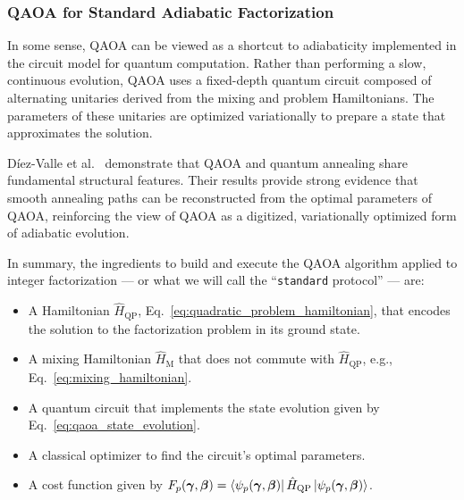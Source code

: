 \subsubsection{QAOA for Standard Adiabatic Factorization}
In some sense, QAOA can be viewed as a shortcut to adiabaticity implemented in the circuit model for quantum computation. Rather than performing a slow, continuous evolution, QAOA uses a fixed-depth quantum circuit composed of alternating unitaries derived from the mixing and problem Hamiltonians. The parameters of these unitaries are optimized variationally to prepare a state that approximates the solution.

Díez-Valle et al.~\cite{diez-valle_universal_2025} demonstrate that QAOA and quantum annealing share fundamental structural features. Their results provide strong evidence that smooth annealing paths can be reconstructed from the optimal parameters of QAOA, reinforcing the view of QAOA as a digitized, variationally optimized form of adiabatic evolution.

In summary, the ingredients to build and execute the QAOA algorithm applied to integer factorization --- or what we will call the ``\texttt{standard} protocol'' --- are:
\begin{itemize}
    \item A Hamiltonian $\hat{H}_\mathrm{QP}$, Eq.~\eqref{eq:quadratic_problem_hamiltonian}, that encodes the solution to the factorization problem in its ground state.
    \item A mixing Hamiltonian $\hat{H}_\mathrm{M}$ that does not commute with $\hat{H}_\mathrm{QP}$, e.g., Eq.~\eqref{eq:mixing_hamiltonian}.
    \item A quantum circuit that implements the state evolution given by Eq.~\eqref{eq:qaoa_state_evolution}.
    \item A classical optimizer to find the circuit's optimal parameters.
    \item A cost function given by $F_p (\bm{\gamma}, \bm{\beta}) = \bra{\psi_p (\bm{\gamma}, \bm{\beta})} \hat{H}_\mathrm{QP} \ket{\psi_p (\bm{\gamma}, \bm{\beta})}$.
\end{itemize}

